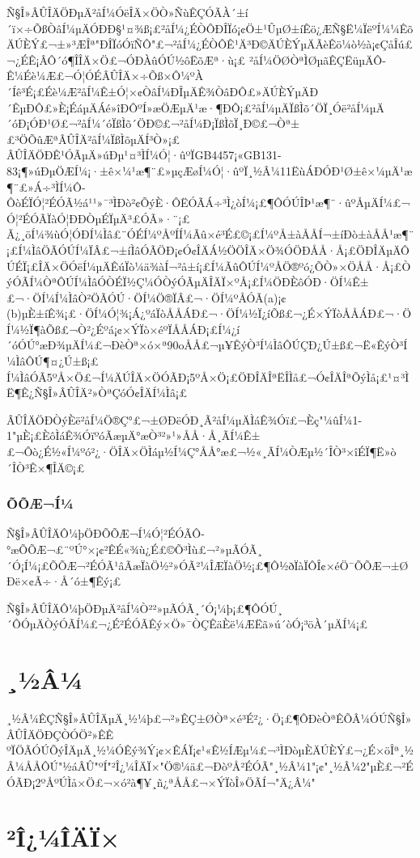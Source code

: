 Ñ§Î»ÂÛÎÄÖÐµÄ²åÍ¼ÓëÎÄ×ÖÒ»ÑùÊÇÓÃÀ´±í´ï×÷ÕßÒâÍ¼µÄÓÐÐ§¹¤¾ß¡£²åÍ¼¿ÉÒÔÐÎÏó¡¢Ö±¹ÛµØ±íÊö¿ÆÑ§Ë¼ÏëºÍ¼¼ÊõÄÚÈÝ£¬±»³ÆÎª"ÐÎÏóÓïÑÔ"£¬²åÍ¼¿ÉÒÔÊ¹Ä³Ð©ÄÚÈÝµÄÃèÊö¼ò½à¡¢ÇåÎú£¬¿ÉÊ¡ÂÔ´ó¶ÎÎÄ×Ö£¬ÓÐÀûÓÚ½ôËõÆª·ù¡£
²åÍ¼ÖØÒªÌØµãÊÇËüµÄÔ­Ê¼Éè¼Æ£¬Ó¦ÓÉÂÛÎÄ×÷Õß×Ô¼ºÀ´Íê³É¡£Éè¼Æ²åÍ¼Ê±Ó¦×¢ÒâÍ¼ÐÎµÄÊ¾ÒâÐÔ£»ÄÚÈÝµÄÐ´ÊµÐÔ£»È¡ÉáµÄÁé»îÐÔºÍ»æÖÆµÄ¹æ·¶ÐÔ¡£²åÍ¼µÄÏßÌõ´ÖÏ¸Óë²åÍ¼µÄ´óÐ¡ÓÐ¹Ø£¬²åÍ¼´óÏßÌõ´ÖÐ©£¬²åÍ¼Ð¡ÏßÌõÏ¸Ð©£¬Òª±£³ÖÕûÆªÂÛÎÄ²åÍ¼ÏßÌõµÄÍ³Ò»¡£
ÂÛÎÄÖÐÊ¹ÓÃµÄ»úÐµ¹¤³ÌÍ¼Ó¦·ûºÏGB4457¡«GB131-83¡¶»úÐµÖÆÍ¼¡·±ê×¼¹æ¶¨£»µçÆøÍ¼Ó¦·ûºÏ¸½Â¼11ËùÁÐÓÐ¹Ø±ê×¼µÄ¹æ¶¨£»Á÷³ÌÍ¼Ô­ÔòÉÏÓ¦²ÉÓÃ½á¹¹»¯³ÌÐò²¢ÕýÈ·ÔËÓÃÁ÷³Ì¿òÍ¼¡£¶ÔÓÚÎÞ¹æ¶¨·ûºÅµÄÍ¼£¬Ó¦²ÉÓÃÏàÓ¦ÐÐÒµÉÏµÄ³£ÓÃ»­·¨¡£
Ã¿¸öÍ¼¾ùÓ¦ÓÐÍ¼Ìâ£¨ÓÉÍ¼ºÅºÍÍ¼Ãû×é³É£©¡£Í¼ºÅ±àÅÅÍ¬±íÐò±àÅÅ¹æ¶¨¡£Í¼ÌâÖÃÓÚÍ¼ÏÂ£¬±íÌâÓÃÖÐ¡¢Ó¢ÎÄÁ½ÖÖÎÄ×Ö¾ÓÖÐÅÅ·Å¡£ÖÐÎÄµÄÔÚÉÏ¡£ÎÄ×ÖÓëÍ¼µÄÊúÏò¼ä¾àÍ¬²å±í¡£Í¼ÃûÔÚÍ¼ºÅÖ®ºó¿ÕÒ»×ÖÅÅ·Å¡£ÒýÓÃÍ¼ÒªÔÚÍ¼ÌâÓÒÉÏ½Ç¼ÓÒýÓÃµÄÎÄÏ×ºÅ¡£Í¼ÖÐÈôÓÐ·ÖÍ¼Ê±£¬·ÖÍ¼Í¼ÌâÒ²ÖÃÓÚ·ÖÍ¼Ö®ÏÂ£¬·ÖÍ¼ºÅÓÃ(a)¡¢(b)µÈ±íÊ¾¡£·ÖÍ¼Ó¦¾¡Á¿ºáÏòÅÅÁÐ£¬·ÖÍ¼½Ï¿íÕß£¬¿É×ÝÏòÅÅÁÐ£¬·ÖÍ¼½Ï¶àÕß£¬Ò²¿Éºá¡¢×ÝÏò×éºÏÅÅÁÐ¡£Í¼¿í´óÓÚ°æÐ¾µÄÍ¼£¬ÐèÒª×ó×ª90oÅÅ£¬µ¥ÊýÒ³Í¼ÌâÔÚÇÐ¿Ú±ß£¬Ë«ÊýÒ³Í¼ÌâÔÚ¶¤¿Ú±ß¡£
Í¼ÌâÓÃ5ºÅ×Ö£¬Í¼ÄÚÎÄ×ÖÓÃÐ¡5ºÅ×Ö¡£ÖÐÎÄÎªËÎÌå£¬Ó¢ÎÄÎªÕýÌå¡£¹¤³ÌË¶Ê¿Ñ§Î»ÂÛÎÄ²»ÒªÇóÓ¢ÎÄÍ¼Ìâ¡£

ÂÛÎÄÖÐÒýÈë²åÍ¼Ö®Ç°£¬±ØÐëÓÐ¸Ã²åÍ¼µÄÌáÊ¾Óï£¬Èç"¼ûÍ¼1-1"µÈ¡£ÈôÌáÊ¾ÓïºóÃæµÄ°æÒ³²»¹»ÅÅ·Å¸ÃÍ¼Ê±£¬Ôò¿É½«Í¼ºó²¿·ÖÎÄ×ÖÌáµ½Í¼Ç°ÅÅ°æ£¬½«¸ÃÍ¼ÒÆµ½´ÎÒ³×îÉÏ¶Ë»ò´ÎÒ³Ê×¶ÎÄ©¡£


\subsubsection{ÕÕÆ¬Í¼}

Ñ§Î»ÂÛÎÄÔ­¼þÖÐÕÕÆ¬Í¼Ó¦²ÉÓÃÔ­°æÕÕÆ¬£¨ºÚ°×¡¢²ÊÉ«¾ù¿É£©Õ³Ìù£¬²»µÃÓÃ¸´Ó¡Í¼¡£ÕÕÆ¬²ÉÓÃ¹âÃæÏàÖ½²»ÓÃ²¼ÎÆÏàÖ½¡£¶Ô½ðÏàÏÔÎ¢×éÖ¯ÕÕÆ¬±ØÐë×¢Ã÷·Å´ó±¶Êý¡£

Ñ§Î»ÂÛÎÄÔ­¼þÖÐµÄ²åÍ¼Ò²²»µÃÓÃ¸´Ó¡¼þ¡£¶ÔÓÚ¸´ÔÓµÄÒýÓÃÍ¼£¬¿É²ÉÓÃÊý×Ö»¯ÒÇÊäÈë¼ÆËã»ú´òÓ¡³öÀ´µÄÍ¼¡£

\section{¸½Â¼}

¸½Â¼ÊÇÑ§Î»ÂÛÎÄµÄ¸½¼þ£¬²»ÊÇ±ØÒª×é³É²¿·Ö¡£¶ÔÐèÒªÊÕÂ¼ÓÚÑ§Î»ÂÛÎÄÖÐÇÒÓÖ²»ÊÊ
ºÏÖÃÓÚÕýÎÄµÄ¸½¼ÓÊý¾Ý¡¢×ÊÁÏ¡¢¹«Ê½ÍÆµ¼£¬³ÌÐòµÈÄÚÈÝ£¬¿É×öÎª¸½Â¼ÅÅÔÚ"½áÂÛ"ºÍ"²Î¿¼ÎÄÏ×"Ö®¼ä£¬ÐòºÅ²ÉÓÃ"¸½Â¼1"¡¢"¸½Â¼2"µÈ£¬²ÉÓÃÐ¡2ºÅºÚÌå×Ö£¬×ó²à¶¥¸ñ¿ªÅÅ£¬×ÝÏòÎ»ÖÃÍ¬"Ä¿Â¼"

\section{²Î¿¼ÎÄÏ×}

